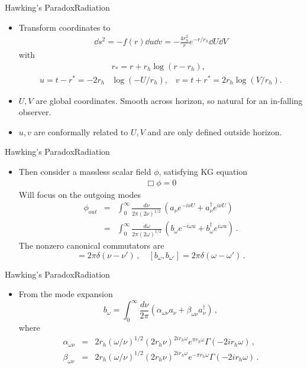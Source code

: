 \documentclass{beamer}[10]
\newcommand{\be}{\begin{equation}}
\newcommand{\ee}{\end{equation}}
\newcommand{\bea}{\begin{eqnarray}}
\newcommand{\eea}{\end{eqnarray}}
\newcommand{\rs}{r_{h}}
\begin{document}
\begin{frame}{Hawking's Paradox}{Radiation}
	\begin{itemize}
		\item Transform coordinates to
		\begin{equation}
			\begin{aligned}
				\dd s^2=-f(r)\dd u \dd v=-\frac{4 r_h^2}{r}e^{-r/r_h}\dd U \dd V
			\end{aligned}
		\end{equation}
	with 
	\begin{equation}
		\begin{aligned}
		&r_*=r+r_h\log(r-r_h),\\ u=t-r^*=-2r_h&\log(-U/r_h),\;\;\; v=t+r^*=2r_h\log(V/r_h).
		\end{aligned}
	\end{equation}
\item $U,V$ are global coordinates. Smooth across horizon, so natural for an in-falling observer. 
\item $u,v$ are conformally related to $U,V$ and are only defined outside horizon.
	\end{itemize}
\end{frame}

\begin{frame}{Hawking's Paradox}{Radiation}
	\begin{itemize}
		\item Then consider a massless scalar field $\phi$, satisfying KG equation
		\begin{equation}
			\begin{aligned}
				\Box \phi =0
			\end{aligned}
		\end{equation}
	Will focus on the outgoing modes
	\bea
	\phi_{out} &=& \int_{0}^\infty \frac{d\nu}{2\pi(2\nu)^{1/2}}\, \left( a_\nu e^{-i\nu U} +a_\nu^\dagger e^{i\nu U} \right) \nonumber\\
	&=& \int_{0}^\infty \frac{d\omega}{2\pi(2\omega)^{1/2}}\, \left( b_\omega e^{-i\omega u} +b_\omega^\dagger e^{i\omega u} \right)   \,.
	\eea
	The nonzero canonical commutators are
	\be
	[ a_\nu, a_{\nu'} ] = 2\pi \delta(\nu-\nu')\,,\quad [ b_\omega, b_{\omega'} ] = 2\pi \delta(\omega-\omega') \,.
	\ee
	\end{itemize}
\end{frame}

\begin{frame}{Hawking's Paradox}{Radiation}
	\begin{itemize}
		\item From the mode expansion
		\be
		b_\omega = \int_{0}^\infty \frac{d\nu}{2\pi}\left( \alpha_{\omega\nu} a_\nu +  \beta_{\omega\nu} a_\nu^\dagger \right)\,, \label{atob}
		\ee
		where
		\bea
		\alpha_{\omega\nu} &=& 2\rs (\omega/\nu)^{1/2} (2 \rs\nu)^{2i  \rs \omega} e^{\pi  \rs \omega} \Gamma(- 2i  \rs \omega) \,, \nonumber\\
		\beta_{\omega\nu} &=& 2\rs (\omega/\nu)^{1/2}  (2 \rs\nu)^{2i  \rs \omega} e^{-\pi  \rs \omega} \Gamma(- 2i  \rs \omega) \,.
		\eea
	\end{itemize}
\end{frame}
\end{document}
